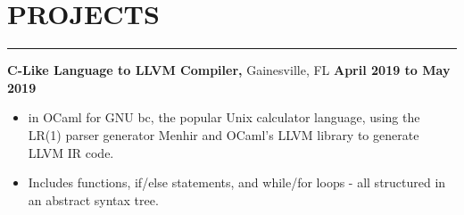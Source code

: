 \section*{PROJECTS}

\hrule \relax
\sectionheaderspace

\noindent\textbf{C-Like Language to LLVM Compiler,} Gainesville, FL  \hfill\textbf{April 2019 to May 2019}
\begin{itemize}[noitemsep,nolistsep, label={-}]
	\item {} in OCaml for GNU bc, the popular Unix calculator language, using the LR(1) parser generator Menhir and OCaml's LLVM library to generate LLVM IR code.
	\item Includes functions, if/else statements, and while/for loops - all structured in an abstract syntax tree.
\end{itemize}
\subsectionspace